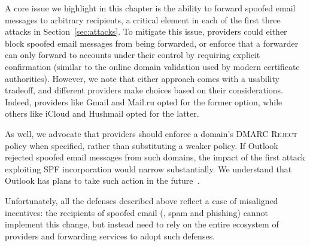 A core issue we highlight in this chapter is the ability to forward spoofed email messages to arbitrary recipients, a critical element in each
of the first three attacks in Section~\ref{sec:attacks}. To mitigate this issue, providers could either block spoofed email messages from being forwarded, or enforce that a forwarder can only forward to accounts under their control by requiring explicit confirmation (similar to
the online domain validation used by modern certificate authorities). However, we note that either approach comes with a usability tradeoff, and different providers make choices based on their considerations. Indeed, providers like Gmail and Mail.ru opted for the former option, while others like iCloud and Hushmail opted for the latter.







As well, we advocate that providers
should enforce a domain's DMARC \textsc{Reject} policy when specified, rather
than substituting a weaker policy.  If Outlook rejected spoofed
email messages from such domains, the impact of the first attack
exploiting SPF incorporation
would
narrow substantially. We understand that Outlook has plans to take such action in the future~\cite{hotmailreject}.


Unfortunately, all the defenses described above reflect a
case of misaligned
incentives: the recipients of spoofed email (\eg, spam and phishing)
cannot implement this change, but instead need to rely on the entire
ecosystem of providers and forwarding services to adopt such defenses. 

